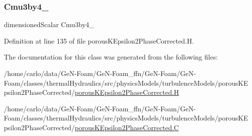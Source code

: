 \subsubsection{\texorpdfstring{Cmu3by4\+\_\+}{Cmu3by4\_}}
{\footnotesize\ttfamily dimensioned\+Scalar Cmu3by4\+\_\+\hspace{0.3cm}{\ttfamily [protected]}}



Definition at line 135 of file porous\+K\+Epsilon2\+Phase\+Corrected.\+H.



The documentation for this class was generated from the following files\+:\begin{DoxyCompactItemize}
\item 
/home/carlo/data/\+Ge\+N-\/\+Foam/\+Ge\+N-\/\+Foam\+\_\+ffn/\+Ge\+N-\/\+Foam/\+Ge\+N-\/\+Foam/classes/thermal\+Hydraulics/src/physics\+Models/turbulence\+Models/porous\+K\+Epsilon2\+Phase\+Corrected/\hyperlink{porousKEpsilon2PhaseCorrected_8H}{porous\+K\+Epsilon2\+Phase\+Corrected.\+H}\item 
/home/carlo/data/\+Ge\+N-\/\+Foam/\+Ge\+N-\/\+Foam\+\_\+ffn/\+Ge\+N-\/\+Foam/\+Ge\+N-\/\+Foam/classes/thermal\+Hydraulics/src/physics\+Models/turbulence\+Models/porous\+K\+Epsilon2\+Phase\+Corrected/\hyperlink{porousKEpsilon2PhaseCorrected_8C}{porous\+K\+Epsilon2\+Phase\+Corrected.\+C}\end{DoxyCompactItemize}
